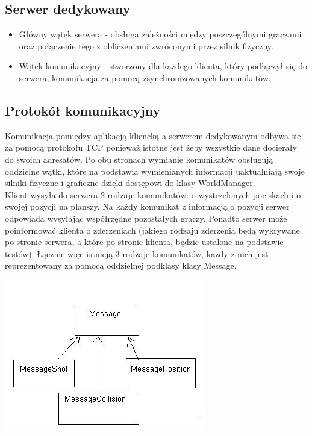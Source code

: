 \documentclass[12pt,a4paper,twoside]{article}
\begin{document}
\subsection{Serwer dedykowany}

\begin{itemize}
\item Główny wątek serwera - obsługa zależności między poszczególnymi graczami oraz połączenie tego z obliczeniami zwróconymi przez silnik fizyczny.
\item Wątek komunikacyjny - stworzony dla każdego klienta, który podłączył się do serwera, komunikacja za pomocą zsynchronizowanych komunikatów.
\end{itemize}

\subsection{Protokół komunikacyjny}
Komunikacja pomiędzy aplikacją kliencką a serwerem dedykowanym odbywa sie za pomocą protokołu TCP ponieważ istotne jest żeby wszystkie dane docierały do swoich adresatów. Po obu stronach wymianie komunikatów obsługują oddzielne wątki, które na podstawia wymienianych informacji uaktualniają swoje silniki fizyczne i graficzne dzięki dostępowi do klasy WorldManager. \\
\newline
Klient wysyła do serwera 2 rodzaje komunikatów: o wystrzelonych pociskach i o swojej pozycji na planszy. Na każdy komunikat z informacją o pozycji serwer odpowiada wysyłając współrzędne pozostałych graczy. Ponadto serwer może poinformować klienta o zderzeniach (jakiego rodzaju zderzenia będą wykrywane po stronie serwera, a które po stronie klienta, będzie ustalone na podstawie testów). Łącznie więc istnieją 3 rodzaje komunikatów, każdy z nich jest reprezentowany za pomocą oddzielnej podklasy klasy Message.

\includegraphics{pics/message.jpg}
\end{document}
